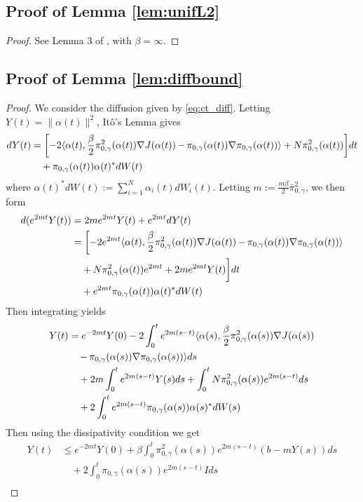 \documentclass[journal,onecolumn]{IEEEtran}
\newcommand{\grad}{\nabla}
\newcommand{\rew}{J}
\newcommand{\alt}{\alpha(t)}
\newcommand{\als}{\alpha(s)}
\newcommand{\brownt}{W(t)}
\newcommand{\brown}{W}
\newcommand{\dimn}{N}
\newcommand{\ids}{\pi}
\newcommand{\idw}{\gamma}
\newcommand{\isp}{0,\idw}
\newcommand{\idistmaxw}{\bar{\ids}_{\isp}}
\newcommand{\idiffc}{I}
\newcommand{\dissm}{m}
\newcommand{\dissb}{b}
\newcommand{\idistrw}{\ids_{\isp}}
\begin{document}
{\subsection*{Proof of Lemma \ref{lem:unifL2}}
\begin{proof}
    See Lemma 3 of \cite{raginsky2017non}, with $\beta = \infty$.
\end{proof}


\subsection*{Proof of Lemma \ref{lem:diffbound}}
\begin{proof}
We consider the diffusion given by \eqref{eq:ct_diff}. Letting $Y(t) = \|\alt\|^2$, It\^o's Lemma gives 
\begin{align*}
    dY(t) &= \biggl[-2\langle \alt,\frac{\beta}{2}\idistrw^2(\alt)\grad \rew(\alt) \,\color{black}{-}\,  \idistrw(\alt)\grad\idistrw(\alt)\rangle + N\idistrw^2(\alt)\biggr]dt \\&\quad + \idistrw(\alt)\alt^*d\brownt
\end{align*}
where $\alt^*d\brownt := \sum_{i=1}^{\dimn}\alpha_i(t)d\brown_i(t)$. Letting $m:=\frac{\dissm\beta}{2}\idistmaxw^2$, we then form 
\begin{align*}
    d(e^{2mt}Y(t)) &= 2me^{2mt}Y(t) + e^{2mt}dY(t) \\
    &= \biggl[-2e^{2mt}\langle \alt,\frac{\beta}{2}\idistrw^2(\alt)\grad \rew(\alt) \,\color{black}{-}\, \idistrw(\alt)\grad\idistrw(\alt)\rangle \\&\quad + \dimn\idistrw^2(\alt)e^{2mt}  + 2me^{2mt}Y(t)\biggr] dt \\&\quad + e^{2mt}\idistrw(\alt)\alt^*d\brownt
\end{align*}
Then integrating yields
\begin{align*}
    Y(t) &= e^{-2mt}Y(0) - 2\int_0^t e^{2m(s-t)} \langle \als,\frac{\beta}{2}\idistrw^2(\als)\grad \rew(\als) \\&\quad \,\color{black}{-}\, \idistrw(\als)\grad\idistrw(\als)\rangle ds \\
    & \quad + 2m\int_0^t e^{2m(s-t)}Y(s)ds + \int_0^t\dimn\idistrw^2(\als)e^{2m(s-t)}ds \\&\quad+ 2\int_0^t
e^{2m(s-t)}\idistrw(\als)\als^*d\brown(s)
\end{align*}
Then using the dissipativity condition  we get
\begin{align*}
Y(t) &\leq e^{-2mt}Y(0) + \beta\int_0^t\idistrw^2(\als) e^{2m(s-t)}(\dissb - \dissm Y(s))ds \\&\quad+ 2\int_0^t\idistrw(\als)e^{2m(s-t)}\idiffc ds\\

\end{align*}
\end{proof}}
\end{document}
